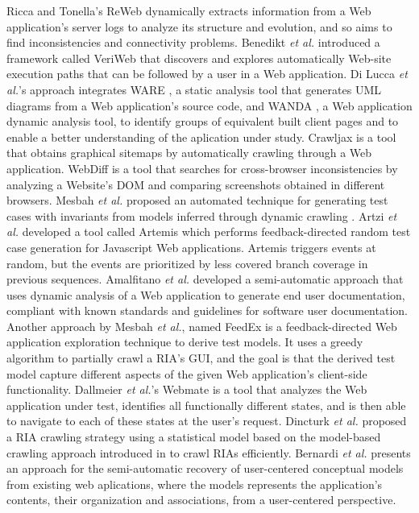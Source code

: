 Ricca and Tonella's ReWeb \cite{ricca2001understanding} dynamically extracts information from a Web application's server logs to analyze its structure and evolution, and so aims to find inconsistencies and connectivity problems. Benedikt \textit{et al.} introduced a framework called VeriWeb \cite{benedikt2002veriWeb} that discovers and explores automatically Web-site execution paths that can be followed by a user in a Web application.
Di Lucca \textit{et al.}'s approach \cite{di2005integrating} integrates WARE \cite{di2004reverse}, a static analysis tool that generates UML diagrams from a Web application's source code, and WANDA \cite{antoniol2004understanding}, a Web application dynamic analysis tool, to identify groups of equivalent built client pages and to enable a better understanding of the aplication under study. 
Crawljax \cite{roest2010automated} is a tool that obtains graphical sitemaps by automatically crawling through a Web application. WebDiff \cite{choudhary2010Webdiff} is a tool that searches for cross-browser inconsistencies by analyzing a Website's DOM and comparing screenshots obtained in different browsers. 
Mesbah \textit{et al.} proposed an automated technique for generating test cases with invariants from models inferred through dynamic crawling \cite{mesbah2012invariant}. 
Artzi \textit{et al.} developed a tool called Artemis \cite{artzi2011framework} which performs feedback-directed random test case generation for Javascript Web applications. Artemis triggers events at random, but the events are prioritized by less covered branch coverage in previous sequences.
Amalfitano \textit{et al.} developed a semi-automatic approach \cite{amalfitano2011using} that uses dynamic analysis of a Web application to generate end user documentation, compliant with known standards and guidelines for software user documentation. 
Another approach by Mesbah \textit{et al.}, named FeedEx \cite{fard2013feedback} is a feedback-directed Web application exploration technique to derive test models. It uses a greedy algorithm to partially crawl a RIA's GUI, and the goal is that the derived test model capture different aspects of the given Web application’s client-side functionality.  Dallmeier \textit{et al.}'s Webmate \cite{dallmeier2012Webmate,dallmeier2013Webmate} is a tool that analyzes the Web application under test, identifies all functionally different states, and is then able to navigate to each of these states at the user’s request. Dincturk \textit{et al.} \cite{dincturk2012statistical} proposed a RIA crawling strategy using a statistical model based on the model-based crawling approach introduced in \cite{benjamin2011strategy} to crawl RIAs efficiently. Bernardi \textit{et al.} \cite{bernardi2008reverse} presents an approach for the semi-automatic 
recovery of user-centered conceptual models from existing web aplications, where the models represents the application’s contents, their organization and 
associations, from a user-centered perspective. 

